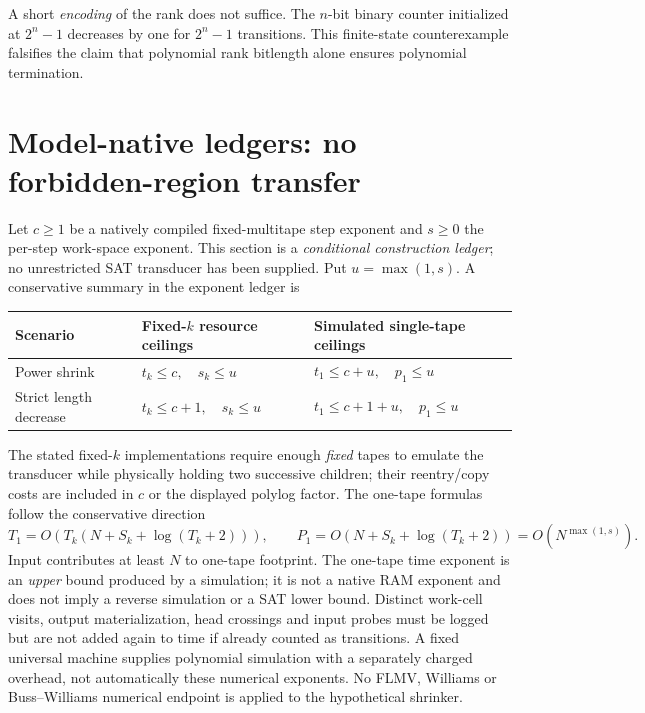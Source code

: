 \documentclass[11pt]{article}
\begin{document}
A short \emph{encoding} of the rank does not suffice. The $n$-bit binary counter initialized at $2^n-1$ decreases by one for $2^n-1$ transitions. This finite-state counterexample falsifies the claim that polynomial rank bitlength alone ensures polynomial termination.

\section{Model-native ledgers: no forbidden-region transfer}
Let $c\ge1$ be a natively compiled fixed-multitape step exponent and $s\ge0$ the per-step work-space exponent. This section is a \emph{conditional construction ledger}; no unrestricted SAT transducer has been supplied.
Put $u=\max(1,s)$. A conservative summary in the exponent ledger is
\begin{center}\small\begin{tabular}{lll}
\toprule
Scenario & Fixed-$k$ resource ceilings & Simulated single-tape ceilings\\\midrule
Power shrink & $t_k\le c,\quad s_k\le u$ & $t_1\le c+u,\quad p_1\le u$\\
Strict length decrease & $t_k\le c+1,\quad s_k\le u$ & $t_1\le c+1+u,\quad p_1\le u$\\
\bottomrule\end{tabular}\end{center}
The stated fixed-$k$ implementations require enough \emph{fixed} tapes to emulate the transducer while physically holding two successive children; their reentry/copy costs are included in $c$ or the displayed polylog factor. The one-tape formulas follow the conservative direction
\[
T_1=O(T_k(N+S_k+\log(T_k+2))),\qquad
P_1=O(N+S_k+\log(T_k+2))=O(N^{\max(1,s)}).
\]
Input contributes at least $N$ to one-tape footprint. The one-tape time exponent is an \emph{upper} bound produced by a simulation; it is not a native RAM exponent and does not imply a reverse simulation or a SAT lower bound. Distinct work-cell visits, output materialization, head crossings and input probes must be logged but are not added again to time if already counted as transitions. A fixed universal machine supplies polynomial simulation with a separately charged overhead, not automatically these numerical exponents. No FLMV, Williams or Buss--Williams numerical endpoint is applied to the hypothetical shrinker.
\end{document}
